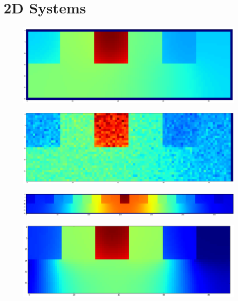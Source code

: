 \newpage
\section{2D Systems}
\label{sec:ra-2D}

	\begin{figure}[h]
		\centering
		\includegraphics[width=1.0\linewidth]{../images/2D/heterogeneous_3U_2D}
		\caption{}
		\label{fig:heterogeneous_3U_2D}
	\end{figure}
	
	\begin{figure}[h]
		\centering
		\includegraphics[width=1.0\linewidth]{../images/2D/MC_heterogeneous_3U_2D}
		\caption{}
		\label{fig:MC_heterogeneous_3U_2D}
	\end{figure}
	
	\begin{figure}[h]
		\centering
		\includegraphics[width=1.0\linewidth]{../images/2D/heterogeneous_11U_2D}
		\caption{}
		\label{fig:heterogeneous_11U_2D}
	\end{figure}
	
	\begin{figure}[h]
		\centering
		\includegraphics[width=1.0\linewidth]{../images/2D/error_in_diffusion}
		\caption{}
		\label{fig:error_in_diffusion}
	\end{figure}
	
